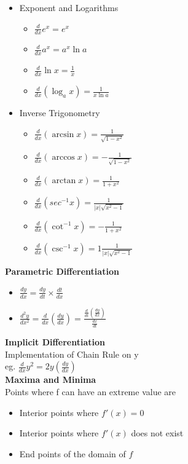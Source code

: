 \documentclass[10pt, a4paper]{article}
\begin{document}
\begin{multicols*}{3}
\begin{itemize}
			\item Exponent and Logarithms
				\begin{itemize}
					\setlength{\itemindent}{-2em}
					\setlength\itemsep{0em}
					\item $\frac{d}{dx} e^x = e^x$
					\item $\frac{d}{dx} a^x = a^x\ln a$
					\item $\frac{d}{dx} \ln x = \frac{1}{x}$
					\item $\frac{d}{dx} (\log_a x) = \frac{1}{x \ln a}$
				\end{itemize}
			\item Inverse Trigonometry
				\begin{itemize}
					\setlength{\itemindent}{-2em}
					\setlength\itemsep{0em}
					\item $\frac{d}{dx}(\arcsin x) = \frac{1}{\sqrt{1 - x^2}}$
					\item $\frac{d}{dx}(\arccos x) = -\frac{1}{\sqrt{1 - x^2}}$
					\item $\frac{d}{dx}(\arctan x) = \frac{1}{1 + x^2}$
					\item $\frac{d}{dx}(sec^{-1} x) = \frac{1}{\lvert x \rvert \sqrt{x^2 - 1}}$
					\item $\frac{d}{dx}(\cot^{-1} x) = - \frac{1}{1 + x^2}$
					\item $\frac{d}{dx}(\csc^{-1} x) = 1\frac{1}{\lvert x \rvert \sqrt{x^2 - 1}}$
				\end{itemize}
		\end{itemize}
	
	\textbf{Parametric Differentiation}
		\begin{itemize}
			\setlength\itemsep{0em}
			\item $\frac{dy}{dx} = \frac{dy}{dt} \times \frac{dt}{dx}$
			\item $\frac{d^2y}{dx^2} = \frac{d}{dx} \left(\frac{dy}{dx}\right) = \frac{\frac{d}{dt} \left( \frac{dy}{dx} \right)}{\frac{dx}{dt}}$
		\end{itemize}
	
	\textbf{Implicit Differentiation}\\
	Implementation of Chain Rule on y\\
	eg. $\frac{d}{dx}y^2 = 2y(\frac{dy}{dx})$\\
	
	\textbf{Maxima and Minima}\\
	Points where f can have an extreme value are
	\begin{itemize}
		\setlength\itemsep{0em}
		\item Interior points where $f'(x) = 0$
		\item Interior points where $f'(x)$ does not exist
		\item End points of the domain of $f$
	\end{itemize}


\end{multicols*}
\end{document}
